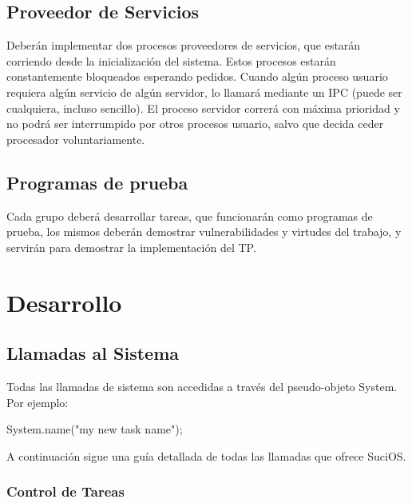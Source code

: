 \documentclass[a4paper,10pt]{article}
\begin{document}
\subsection{Proveedor de Servicios}
Deberán implementar dos procesos proveedores de servicios, que estarán corriendo 
desde la inicialización del sistema. Estos procesos estarán constantemente
bloqueados esperando pedidos. Cuando algún proceso usuario requiera algún
servicio de algún servidor, lo llamará mediante un IPC (puede ser cualquiera,
incluso sencillo). El proceso servidor correrá con máxima prioridad y no podrá
ser interrumpido por otros procesos usuario, salvo que decida ceder procesador
voluntariamente.

\subsection{Programas de prueba}
Cada grupo deberá desarrollar tareas, que funcionarán como programas de
prueba, los mismos deberán demostrar vulnerabilidades y virtudes del trabajo,
y servirán para demostrar la implementación del TP.


\newpage


\section{Desarrollo}

\subsection{Llamadas al Sistema}
Todas las llamadas de sistema son accedidas a través del pseudo-objeto System. Por ejemplo:

System.name("my new task name");

A continuación sigue una guía detallada de todas las llamadas que ofrece SuciOS.

\subsubsection{Control de Tareas}
\end{document}
